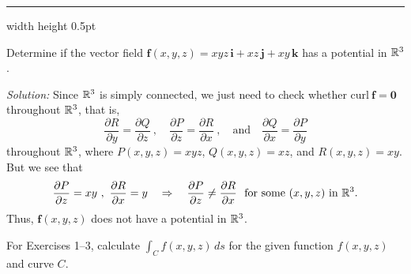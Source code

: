 \medskip
\hrule width \textwidth height 0.5pt
\begin{exmp}
 Determine if the vector field $\mathbf{f}(x,y,z) = xyz\,\mathbf{i} + xz\,\mathbf{j} + xy\,\mathbf{k}$ has a
 potential in $\mathbb{R}^{3}$.\smallskip
 \par\noindent\emph{Solution:} Since $\mathbb{R}^{3}$ is simply connected, we just need to check whether $\text{curl}~
 \mathbf{f} = \mathbf{0}$ throughout $\mathbb{R}^{3}$, that is,
 \begin{displaymath}
  \frac{\partial R}{\partial y} = \frac{\partial Q}{\partial z}~,\quad
  \frac{\partial P}{\partial z} = \frac{\partial R}{\partial x}~,\quad\text{and}\quad
  \frac{\partial Q}{\partial x} = \frac{\partial P}{\partial y}
 \end{displaymath}
 throughout $\mathbb{R}^{3}$, where $P(x,y,z)=xyz$, $Q(x,y,z)=xz$, and $R(x,y,z)=xy$. But we see that
 \begin{displaymath}
  \frac{\partial P}{\partial z} = xy ~,~ \frac{\partial R}{\partial x} = y \quad\Rightarrow\quad
  \frac{\partial P}{\partial z} \ne \frac{\partial R}{\partial x} ~~\text{for some $(x,y,z)$ in $\mathbb{R}^{3}$.}
 \end{displaymath}
 Thus, $\mathbf{f}(x,y,z)$ does not have a potential in $\mathbb{R}^{3}$.
\end{exmp}
\startexercises\label{sec4dot5}
\par\noindent For Exercises 1--3, calculate $\int_C f(x,y,z)\,ds$ for the given function $f(x,y,z)$ and
curve $C$.
